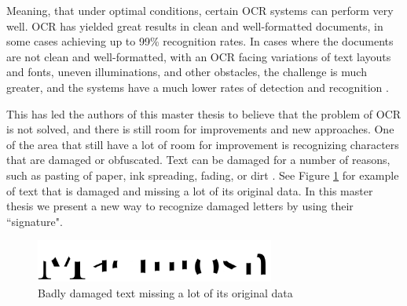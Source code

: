 Meaning, that under optimal conditions, certain OCR systems can perform very well. OCR has yielded great results in clean and well-formatted documents, in some cases achieving up to 99\% recognition rates. In cases where the documents are not clean and well-formatted, with an OCR facing variations of text layouts and fonts, uneven illuminations, and other obstacles, the challenge is much greater, and the systems have a much lower rates of detection and recognition \citep{ye2015text}.


This has led the authors of this master thesis to believe that the problem of OCR is not solved, and there is still room for improvements and new approaches. One of the area that still have a lot of room for improvement is recognizing characters that are damaged or obfuscated. Text can be damaged for a number of reasons, such as pasting of paper, ink spreading, fading, or dirt \citep{bhardwaj2014imaging}. See Figure \ref{fig:damaged-text} for example of text that is damaged and missing a lot of its original data. In this master thesis we present a new way to recognize damaged letters by using their ``signature".

\begin{figure}[ht]
    \centering
    \includegraphics[width=0.7\textwidth]{fig/chapter1/damaged.png}
    \caption{Badly damaged text missing a lot of its original data}
    \label{fig:damaged-text}
\end{figure}


